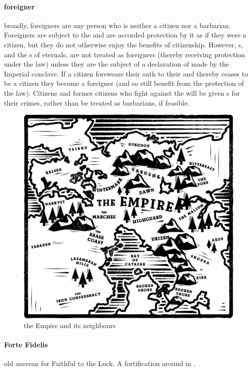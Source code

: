 \paragraph{foreigner} broadly, foreigners are any person who is neither a citizen nor a barbarian. Foreigners are subject to the  and are accorded protection by it as if they were a citizen, but they do not otherwise enjoy the benefits of citizenship. However, s, and the s of eternals, are not treated as foreigners (thereby receiving protection under the law) unless they are the subject of a declaration of  made by the Imperial conclave. If a citizen forswears their oath to their  and thereby ceases to be a citizen they become a foreigner (and so still benefit from the protection of the law). Citizens and former citizens who fight against the  will be given s for their crimes, rather than be treated as barbarians, if feasible. \begin{figure}\centering\includegraphics[width=1.0\textwidth,trim={0.6cm 0.6cm 0.6cm 0.6cm},clip]{encyclopedia/worldmap}\caption{the Empire and its neighbours}\end{figure}
\paragraph{Forte Fidelis} old asavean for Faithful to the Luck. A fortification around  in .
